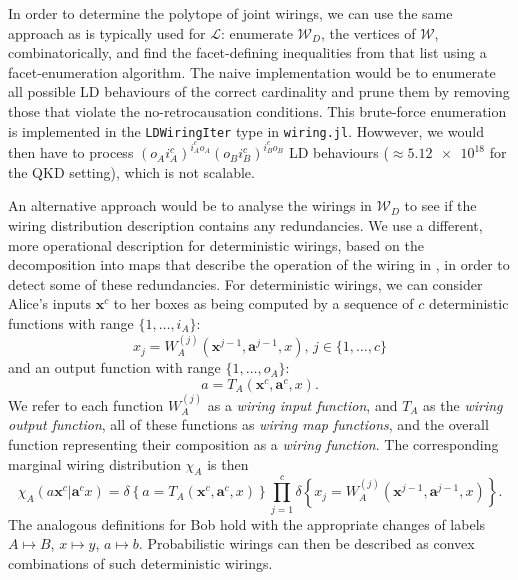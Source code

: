 \documentclass[10pt, a4paper]{article}
\numberwithin{equation}{section} %
\theoremstyle{definition}
\theoremstyle{plain}
\newcommand{\dintv}[2]{\mathopen\{#1,\ldots,#2\mathclose\}}
\newcommand{\?}{\mathrel{?}} %
\newcommand{\cvec}[1]{\boldsymbol{\mathbf{#1}}}    %
\newcommand{\indic}[1]{\delta{\left\{#1\right\}}} %
\newcommand{\sW}{\mathcal{W}}
\newcommand{\Ls}{\mathcal{L}}
\begin{document}
              In order to determine the polytope of joint wirings, we can use the same approach as is typically used for \(\Ls\): enumerate \(\sW_D\), the vertices of \(\sW\), combinatorically, and find the facet-defining inequalities from that list using a facet-enumeration algorithm. The naive implementation would be to enumerate all possible LD behaviours of the correct cardinality and prune them by removing those that violate the no-retrocausation conditions. This brute-force enumeration is implemented in the \verb`LDWiringIter` type in \verb`wiring.jl`. Howwever, we would then have to process \({(o_A i_A^c)}^{i_A^c o_A} {(o_B i_B^c)}^{i_B^c o_B}\) LD behaviours (\(\approx \num{5.12e18}\) for the QKD setting), which is not scalable.

              An alternative approach would be to analyse the wirings in \(\sW_D\) to see if the wiring distribution description contains any redundancies. We use a different, more operational description for deterministic wirings, based on the decomposition into maps that describe the operation of the wiring in , in order to detect some of these redundancies.  For deterministic wirings, we can consider Alice's inputs \(\cvec{x}^c\) to her boxes as being computed by a sequence of \(c\) deterministic functions with range \(\dintv{1}{i_A}\):
              \begin{equation} x_j = W^{(j)}_{A}(\cvec{x}^{j-1}, \cvec{a}^{j-1}, x),\,j \in \dintv{1}{c} \end{equation}
              and an output function with range \(\dintv{1}{o_A}\):
              \begin{equation} a = T_{A}(\cvec{x}^{c}, \cvec{a}^{c}, x). \end{equation}
              We refer to each function \(W_{A}^{(j)}\) as a \emph{wiring input function}, and \(T_{A}\) as the \emph{wiring output function}, all of these functions as \emph{wiring map functions}, and the overall function representing their composition as a \emph{wiring function}. The corresponding marginal wiring distribution \(\chi_{A}\) is then
              \begin{equation}
                \chi_{A}(a\cvec{x}^c|\cvec{a}^cx) = \indic{a = T_{A}(\cvec{x}^{c}, \cvec{a}^{c}, x)} \prod_{j=1}^c \indic{x_j = W^{(j)}_{A}(\cvec{x}^{j-1}, \cvec{a}^{j-1}, x)}.
              \end{equation}
              The analogous definitions for Bob hold with the appropriate changes of labels \(A \mapsto B\), \(x \mapsto y\), \(a \mapsto b\). Probabilistic wirings can then be described as convex combinations of such deterministic wirings.
\end{document}
